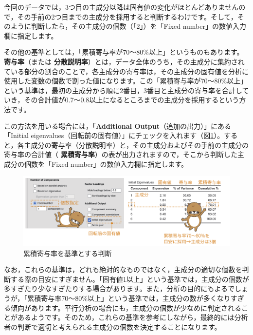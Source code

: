 \documentclass[
  12pt,
  a5jpaper,
  lualatex, ja=standard]{bxjsbook}
\renewcommand{\emph}[1]{\textbf{\color{emph} #1}}
\begin{document}
今回のデータでは，3つ目の主成分以降は固有値の変化がほとんどありませんので，その手前の2つ目までの主成分を採用すると判断するわけです。そして，そのように判断したら，その主成分の個数（「2」）を「Fixed number」の数値入力欄に指定します。

その他の基準としては，「累積寄与率が70〜80\%以上」というものもあります。\emph{寄与率}（または\emph{分散説明率}）とは，データ全体のうち，その主成分に集約されている部分の割合のことで，各主成分の寄与率は，その主成分の固有値を分析に使用した変数の個数で割った値になります。この「累積寄与率が70〜80\%以上」という基準は，最初の主成分から順に2番目，3番目と主成分の寄与率を合計していき，その合計値が0.7〜0.8以上になるところまでの主成分を採用するという方法です。

この方法を用いる場合には，「\textbf{Additional Output}（追加の出力）」にある「Initial eigenvalues（回転前の固有値）」にチェックを入れます（図\ref{fig:factor-pca-cumulative}）。すると，各主成分の寄与率（分散説明率）と，その主成分およびその手前の主成分の寄与率の合計値（\emph{累積寄与率}）の表が出力されますので，そこから判断した主成分の個数を「Fixed number」の数値入力欄に指定します。

\begin{figure}[!ht]

{\centering \includegraphics[width=1\linewidth]{images/factor/pca-cumulative} 

}

\caption{累積寄与率を基準とする判断}\label{fig:factor-pca-cumulative}
\end{figure}

なお，これらの基準は，どれも絶対的なものではなく，主成分の適切な個数を判断する際の目安にすぎません。「固有値1以上」という基準では，主成分の個数が多すぎたり少なすぎたりする場合があります。また，分析の目的にもよるでしょうが，「累積寄与率70〜80\%以上」という基準では，主成分の数が多くなりすぎる傾向があります。平行分析の場合にも，主成分の個数が少なめに判定されることがあるようです。そのため，これらの基準を参考にしながら，最終的には分析者の判断で適切と考えられる主成分の個数を決定することになります。
\end{document}
